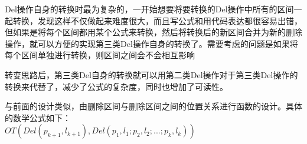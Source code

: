\par Del操作自身的转换时最为复杂的，一开始想要将要转换的Del操作中所有的区间一起转换，发现这样不仅做起来难度很大，而且写公式和用代码表达都很容易出错，但如果是将每个区间都用某个公式来转换，然后将转换后的新区间合并为新的删除操作，就可以方便的实现第三类Del操作自身的转换了。需要考虑的问题是如果将每个区间单独进行转换，则区间之间会不会相互影响
\par 转变思路后，第三类Del自身的转换就可以用第二类Del操作对于第三类Del操作的转换来代替了，减少了公式的复杂度，同时也增加了可读性。
\par 与前面的设计类似，由删除区间与删除区间之间的位置关系进行函数的设计。具体的数学公式如下：\\

\newpage
$OT(Del(p_{k+1},l_{k+1}),Del(p_1,l_1;p_2,l_2;...;p_k,l_k))$\\
